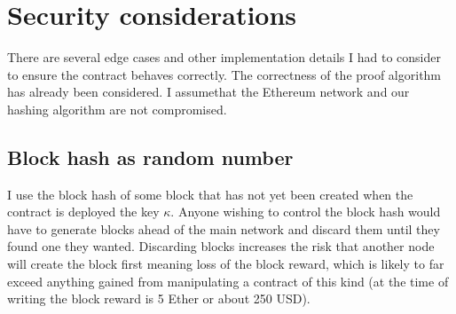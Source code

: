 \documentclass[12pt,a4paper,twoside,openright]{report}
\begin{document}
%
%
%
%
%

\section{Security considerations}

There are several edge cases and other implementation details I had to consider to ensure the contract behaves correctly.
The correctness of the proof algorithm has already been considered.
I assumethat the Ethereum network and our hashing algorithm are not compromised.

\subsection{Block hash as random number}

I use the block hash of some block that has not yet been created when the contract is deployed the key $\kappa$.
Anyone wishing to control the block hash would have to generate blocks ahead of the main network
and discard them until they found one they wanted.
Discarding blocks increases the risk that another node will create the block first meaning loss of the block reward, which is likely to
far exceed anything gained from manipulating a contract of this kind (at the time of writing the block reward is 5 Ether or about 250 USD).
\end{document}
